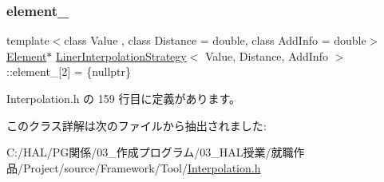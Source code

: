 \subsubsection{\texorpdfstring{element\+\_\+}{element\_}}
{\footnotesize\ttfamily template$<$class Value , class Distance  = double, class Add\+Info  = double$>$ \\
\mbox{\hyperlink{class_liner_interpolation_strategy_acbc8878179146c4a0f3ab0eb75c9d229}{Element}}$\ast$ \mbox{\hyperlink{class_liner_interpolation_strategy}{Liner\+Interpolation\+Strategy}}$<$ Value, Distance, Add\+Info $>$\+::element\+\_\+\mbox{[}2\mbox{]} = \{nullptr\}\hspace{0.3cm}{\ttfamily [private]}}



 Interpolation.\+h の 159 行目に定義があります。



このクラス詳解は次のファイルから抽出されました\+:\begin{DoxyCompactItemize}
\item 
C\+:/\+H\+A\+L/\+P\+G関係/03\+\_\+作成プログラム/03\+\_\+\+H\+A\+L授業/就職作品/\+Project/source/\+Framework/\+Tool/\mbox{\hyperlink{_interpolation_8h}{Interpolation.\+h}}\end{DoxyCompactItemize}
